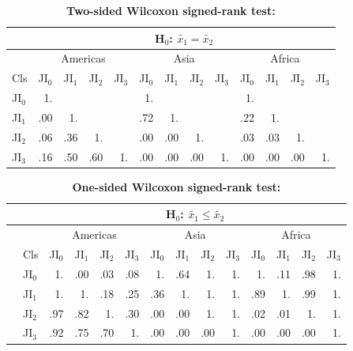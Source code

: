 		\begin{table}[ht]
			\centering
			\caption[Two-sided Wilcoxon signed-rank test]{\textbf{Two-sided Wilcoxon signed-rank test:}}
			\label{tab:wilcoxontwosided}
			\begin{tabular}{lrrrrrrrrrrrr}
				\hline
				& \multicolumn{12}{c}{H$_0$: $\tilde{x_1}=\tilde{x_2}$} \\\hline
				& \multicolumn{4}{c}{Americas} & \multicolumn{4}{c}{Asia} & \multicolumn{4}{c}{Africa} \\
				Cls & JI$_0$ & JI$_1$ & JI$_2$ & JI$_3$ & JI$_0$ & JI$_1$ & JI$_2$ & JI$_3$ & JI$_0$ & JI$_1$ & JI$_2$ & JI$_3$ \\\hline
				JI$_0$ & 1. &  &  &  & 1. &  &  &  & 1. &  &  & \\
				JI$_1$ & .00 & 1. &  &  & .72 & 1. &  &  & .22 & 1. &  & \\
				JI$_2$ & .06 & .36 & 1. &  & .00 & .00 & 1. &  & .03 & .03 & 1. & \\
				JI$_3$ & .16 & .50 & .60 & 1. & .00 & .00 & .00 & 1. & .00 & .00 & .00 & 1. \\\hline
			\end{tabular}
		\end{table}

		\begin{table}[ht]
			\centering
			\caption[One-sided Wilcoxon signed-rank test]{\textbf{One-sided Wilcoxon signed-rank test:}}
			\label{tab:wilcoxononesided}
			\begin{tabular}{llrrrrrrrrrrrr}
				\hline
				& & \multicolumn{12}{c}{H$_0$: $\tilde{x_1}\leq\tilde{x_2}$} \\\hline
				& & \multicolumn{4}{c}{Americas} & \multicolumn{4}{c}{Asia} & \multicolumn{4}{c}{Africa} \\
				& Cls & JI$_0$ & JI$_1$ & JI$_2$ & JI$_3$ & JI$_0$ & JI$_1$ & JI$_2$ & JI$_3$ & JI$_0$ & JI$_1$ & JI$_2$ & JI$_3$ \\\hline
				\multirow{4}{*}{\STAB{\rotatebox[origin=c]{90}{H$_0$: $\tilde{x_1}\geq\tilde{x_2}$}}} & JI$_0$ & 1. & .00 & .03 & .08 & 1. & .64 & 1. & 1. & 1. & .11 & .98 & 1. \\
				& JI$_1$ & 1. & 1. & .18 & .25 & .36 & 1. & 1. & 1. & .89 & 1. & .99 & 1. \\
				& JI$_2$ & .97 & .82 & 1. & .30 & .00 & .00 & 1. & 1. & .02 & .01 & 1. & 1. \\
				& JI$_3$ & .92 & .75 & .70 & 1. & .00 & .00 & .00 & 1. & .00 & .00 & .00 & 1. \\\hline
			\end{tabular}
		\end{table}

